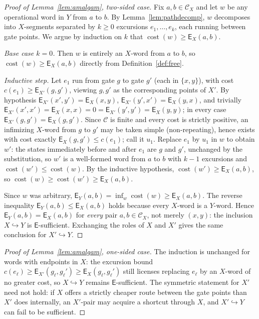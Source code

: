 \documentclass[11pt]{article}
\theoremstyle{remark}
\newcommand{\C}{\mathcal{C}}
\newcommand{\E}{\mathsf{E}}
\begin{document}
\begin{proof}[Proof of Lemma~\ref{lem:amalgam}, two-sided case]
Fix $a,b\in\C_X$ and let $w$ be any operational word in $Y$ from $a$
to $b$. By Lemma~\ref{lem:pathdecomp}, $w$ decomposes into $X$-segments
separated by $k\ge0$ excursions $e_1,\dots,e_k$, each running between
gate points. We argue by induction on $k$ that
$\operatorname{cost}(w)\ge\E_X(a,b)$.

\emph{Base case $k=0$.} Then $w$ is entirely an $X$-word from $a$ to
$b$, so $\operatorname{cost}(w)\ge\E_X(a,b)$ directly from
Definition~\ref{def:free}.

\emph{Inductive step.} Let $e_1$ run from gate $g$ to gate $g'$
(each in $\{x,y\}$), with cost $c(e_1)\ge \E_{X'}(g,g')$, viewing
$g,g'$ as the corresponding points of $X'$. By hypothesis
$\E_{X'}(x',y')=\E_X(x,y)$, $\E_{X'}(y',x')=\E_X(y,x)$, and trivially
$\E_{X'}(x',x')=\E_X(x,x)=0=\E_{X'}(y',y')=\E_X(y,y)$; in every case
$\E_{X'}(g,g')=\E_X(g,g')$. Since $\C$ is finite and every cost is
strictly positive, an infimizing $X$-word from $g$ to $g'$ may be
taken simple (non-repeating), hence exists with cost exactly
$\E_X(g,g')\le c(e_1)$; call it $u_1$. Replace $e_1$ by $u_1$ in $w$
to obtain $w'$: the states immediately before and after $e_1$ are $g$
and $g'$, unchanged by the substitution, so $w'$ is a well-formed
word from $a$ to $b$ with $k-1$ excursions and
$\operatorname{cost}(w')\le\operatorname{cost}(w)$. By the inductive
hypothesis, $\operatorname{cost}(w')\ge\E_X(a,b)$, so
$\operatorname{cost}(w)\ge\operatorname{cost}(w')\ge\E_X(a,b)$.

Since $w$ was arbitrary, $\E_Y(a,b)=\inf_w\operatorname{cost}(w)\ge\E_X(a,b)$.
The reverse inequality $\E_Y(a,b)\le\E_X(a,b)$ holds because every
$X$-word is a $Y$-word. Hence $\E_Y(a,b)=\E_X(a,b)$ for \emph{every}
pair $a,b\in\C_X$, not merely $(x,y)$: the inclusion $X\hookrightarrow
Y$ is $\E$-sufficient. Exchanging the roles of $X$ and $X'$ gives the
same conclusion for $X'\hookrightarrow Y$.
\end{proof}

\begin{proof}[Proof of Lemma~\ref{lem:amalgam}, one-sided case]
The induction is unchanged for words with endpoints in $X$: the
excursion bound $c(e_\ell)\ge\E_{X'}(g_\ell,g_\ell')\ge\E_X(g_\ell,g_\ell')$
still licenses replacing $e_\ell$ by an $X$-word of no greater cost,
so $X\hookrightarrow Y$ remains $\E$-sufficient. The symmetric
statement for $X'$ need not hold: if $X$ offers a strictly cheaper
route between the gate points than $X'$ does internally, an
$X'$-pair may acquire a shortcut through $X$, and $X'\hookrightarrow
Y$ can fail to be sufficient.
\end{proof}
\end{document}

